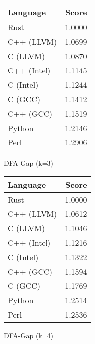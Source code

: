 \begin{subtable}{0.33\textwidth}
    \centering
    \begin{tabular}{|l|r|}
        \hline
        Language & Score \\
        \hline
        Rust & 1.0000 \\
        C++ (LLVM) & 1.0699 \\
        C (LLVM) & 1.0870 \\
        C++ (Intel) & 1.1145 \\
        C (Intel) & 1.1244 \\
        C (GCC) & 1.1412 \\
        C++ (GCC) & 1.1519 \\
        Python & 1.2146 \\
        Perl & 1.2906 \\
        \hline
    \end{tabular}
    \caption{DFA-Gap (k=3)}
    \label{table:energy:dfa_gap(3)}
\end{subtable}%
\begin{subtable}{0.33\textwidth}
    \centering
    \begin{tabular}{|l|r|}
        \hline
        Language & Score \\
        \hline
        Rust & 1.0000 \\
        C++ (LLVM) & 1.0612 \\
        C (LLVM) & 1.1046 \\
        C++ (Intel) & 1.1216 \\
        C (Intel) & 1.1322 \\
        C++ (GCC) & 1.1594 \\
        C (GCC) & 1.1769 \\
        Python & 1.2514 \\
        Perl & 1.2536 \\
        \hline
    \end{tabular}
    \caption{DFA-Gap (k=4)}
    \label{table:energy:dfa_gap(4)}
\end{subtable}%
